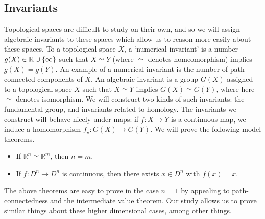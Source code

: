 \subsection{Invariants}
Topological spaces are difficult to study on their own, and so we will assign algebraic invariants to these spaces which allow us to reason more easily about these spaces.
To a topological space \( X \), a `numerical invariant' is a number \( g(X) \in \mathbb R \cup \qty{\infty} \) such that \( X \simeq Y \) (where \( \simeq \) denotes homeomorphism) implies \( g(X) = g(Y) \).
An example of a numerical invariant is the number of path-connected components of \( X \).
An algebraic invariant is a group \( G(X) \) assigned to a topological space \( X \) such that \( X \simeq Y \) implies \( G(X) \simeq G(Y) \), where here \( \simeq \) denotes isomorphism.
We will construct two kinds of such invariants: the fundamental group, and invariants related to homology.
The invariants we construct will behave nicely under maps: if \( f \colon X \to Y \) is a continuous map, we induce a homomorphism \( f_\star \colon G(X) \to G(Y) \).
We will prove the following model theorems.
\begin{itemize}
	\item If \( \mathbb R^n \simeq \mathbb R^m \), then \( n = m \).
	\item If \( f \colon D^n \to D^n \) is continuous, then there exists \( x \in D^n \) with \( f(x) = x \).
\end{itemize}
The above theorems are easy to prove in the case \( n = 1 \) by appealing to path-connectedness and the intermediate value theorem.
Our study allows us to prove similar things about these higher dimensional cases, among other things.

